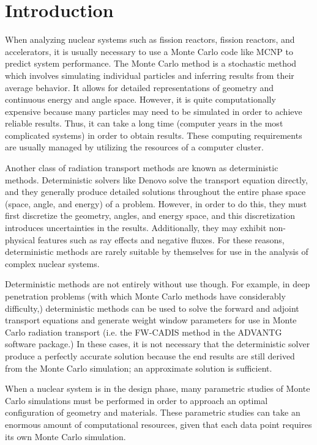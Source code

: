 \chapter{Introduction}
\label{chap:intro}

When analyzing nuclear systems such as fission reactors, fission reactors, and accelerators, it is usually necessary to use a Monte Carlo code like MCNP \cite{mcnp620} to predict system performance.
The Monte Carlo method is a stochastic method which involves simulating individual particles and inferring results from their average behavior.
It allows for detailed representations of geometry and continuous energy and angle space.
However, it is quite computationally expensive because many particles may need to be simulated in order to achieve reliable results.
Thus, it can take a long time (computer years in the most complicated systems) in order to obtain results.
These computing requirements are usually managed by utilizing the resources of a computer cluster.

Another class of radiation transport methods are known as deterministic methods.
Deterministic solvers like Denovo \cite{denovo} solve the transport equation directly, and they generally produce detailed solutions throughout the entire phase space (space, angle, and energy) of a problem.
However, in order to do this, they must first discretize the geometry, angles, and energy space, and this discretization introduces uncertainties in the results.
Additionally, they may exhibit non-physical features such as ray effects and negative fluxes.
For these reasons, deterministic methods are rarely suitable by themselves for use in the analysis of complex nuclear systems.

Deterministic methods are not entirely without use though.
For example, in deep penetration problems (with which Monte Carlo methods have considerably difficulty,) deterministic methods can be used to solve the forward and adjoint transport equations and generate weight window parameters for use in Monte Carlo radiation transport (i.e. the FW-CADIS method \cite{fwcadis} in the ADVANTG \cite{advantg} software package.)
In these cases, it is not necessary that the deterministic solver produce a perfectly accurate solution because the end results are still derived from the Monte Carlo simulation; an approximate solution is sufficient.

When a nuclear system is in the design phase, many parametric studies of Monte Carlo simulations must be performed in order to approach an optimal configuration of geometry and materials.
These parametric studies can take an enormous amount of computational resources, given that each data point requires its own Monte Carlo simulation.


